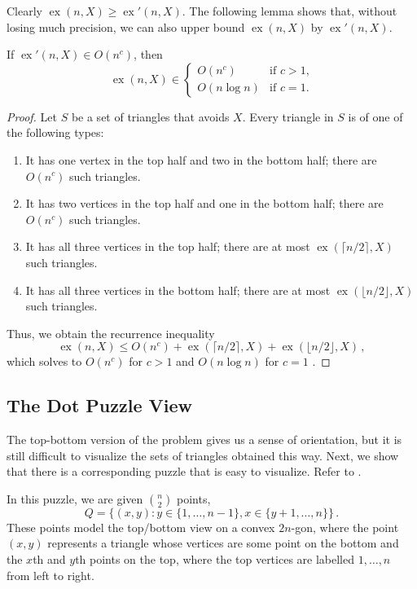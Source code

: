 \documentclass{patmorin}
\newcommand{\borisspace}{\,}
\DeclareMathOperator{\ex}{ex}
\begin{document}
Clearly $\ex(n,X)\ge\ex'(n,X)$.  The following lemma shows that, without
losing much precision, we can also upper bound $\ex(n,X)$ by $\ex'(n,X)$.

\begin{lem}
  If $\ex'(n,X)\in O(n^c)$, then
  \[
     \ex(n,X)\in 
        \begin{cases} 
            O(n^c)     & \text{if $c>1$,} \\
            O(n\log n) & \text{if $c=1$.}
        \end{cases}
  \]
\end{lem}

\begin{proof}
   Let $S$ be a set of triangles that avoids $X$.  Every triangle in $S$
   is of one of the following types:
   \begin{enumerate}
      \item It has one vertex in the top half and two in the bottom half;
        there are $O(n^{c})$ such triangles.
      \item It has two vertices in the top half and one in the bottom
        half; there are $O(n^{c})$ such triangles.
      \item It has all three vertices in the top half; there are at most
        $\ex(\lceil n/2\rceil,X)$ such triangles.
      \item It has all three vertices in the bottom half; there are at
        most $\ex(\lfloor n/2\rfloor,X)$ such triangles.
   \end{enumerate}
   Thus, we obtain the recurrence inequality
   \[  \ex(n,X) \le O(n^{c}) + \ex(\lceil n/2\rceil,X) + \ex(\lfloor n/2\rfloor,X) \borisspace ,\]
   which solves to $O(n^c)$ for $c>1$ and $O(n\log n)$ for $c=1$ \cite[Section~4.3]{cormen.leiserson.ea:introduction}.
\end{proof}


\subsection{The Dot Puzzle View}

The top-bottom version of the problem gives us a sense of orientation,
but it is still difficult to visualize the sets of triangles obtained
this way. Next, we show that there is a corresponding puzzle that is
easy to visualize.  Refer to .  

In this puzzle, we are given $\binom{n}{2}$ points,
\[
    Q = \{(x,y): y\in\{1,\ldots,n-1\}, x\in\{y+1,\ldots,n\} \} \borisspace .
\]
These points model the top/bottom view on a convex $2n$-gon, where the
point $(x,y)$ represents a triangle whose vertices are some point on
the bottom and the $x$th and $y$th points on the top, where the top
vertices are labelled $1,\ldots,n$ from left to right.
\end{document}
